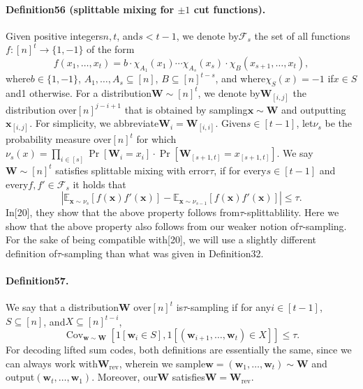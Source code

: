 \documentclass[10pt,a4paper]{article}
\DeclareMathOperator{\Cov}{Cov}
\begin{document}
\paragraph{Definition56 (splittable mixing for $\pm1$ cut functions).} Given positive integers$n,t$, and$s<t-1$, we denote by$\mathcal F_s$ the set of all functions$f:[n]^t\to\{1,-1\}$ of the form
\[f(x_1,\ldots,x_t)=b\cdot\chi_{A_1}(x_1)\cdots\chi_{A_s}(x_s)\cdot\chi_B(x_{s+1},\ldots,x_t),\tag{27}\]
where$b\in\{1,-1\}$, $A_1,\ldots,A_s\subseteq[n]$, $B\subseteq[n]^{t-s}$, and where$\chi_S(x)=-1$ if$x\in S$ and1 otherwise.
For a distribution$\mathbf W\sim[n]^t$, we denote by$\mathbf W_{[i,j]}$ the distribution over$[n]^{j-i+1}$ that is obtained by sampling$\mathbf x\sim\mathbf W$ and outputting$\mathbf x_{[i,j]}$. For simplicity, we abbreviate$\mathbf W_i=\mathbf W_{[i,i]}$. Given$s\in[t-1]$, let$\nu_s$ be the probability measure over$[n]^t$ for which$\nu_s(x)=\prod_{i\in[s]}\Pr[\mathbf W_i=x_i]\cdot\Pr[\mathbf W_{[s+1,t]}=x_{[s+1,t]}]$. We say$\mathbf W\sim[n]^t$ satisfies splittable mixing with error$\tau$, if for every$s\in[t-1]$ and every$f,f'\in\mathcal F_s$ it holds that
\[\left|\mathbb E_{\mathbf x\sim\nu_s}[f(\mathbf x)f'(\mathbf x)]-\mathbb E_{\mathbf x\sim\nu_{s-1}}[f(\mathbf x)f'(\mathbf x)]\right|\leq\tau.\tag{28}\]
In[20], they show that the above property follows from$\tau$-splittablility. Here we show that the above property also follows from our weaker notion of$\tau$-sampling. For the sake of being compatible with[20], we will use a slightly different definition of$\tau$-sampling than what was given in Definition32.
\paragraph{Definition57.} We say that a distribution$\mathbf W$ over$[n]^t$ is$\tau$-sampling if for any$i\in[t-1]$, $S\subseteq[n]$, and$X\subseteq[n]^{t-i}$,
\[\Cov_{\mathbf w\sim\mathbf W}[1[\mathbf w_i\in S],1[(\mathbf w_{i+1},\ldots,\mathbf w_t)\in X]]\leq\tau.\]
For decoding lifted sum codes, both definitions are essentially the same, since we can always work with$\mathbf W_{\mathrm{rev}}$, wherein we sample$\mathbf w=(\mathbf w_1,\ldots,\mathbf w_t)\sim\mathbf W$ and output$(\mathbf w_t,\ldots,\mathbf w_1)$. Moreover, our$\mathbf W$ satisfies$\mathbf W=\mathbf W_{\mathrm{rev}}$.
\end{document}
